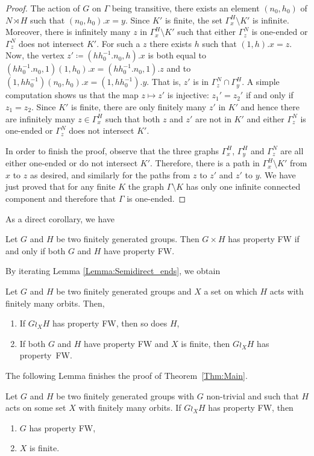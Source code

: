 \begin{proof}
The action of $G$ on $\Gamma$ being transitive, there exists an element $(n_0,h_0)$ of $N \rtimes H$ such that $(n_0,h_0).x = y$.
Since $K'$ is finite, the set $\Gamma_x^H\setminus K'$ is infinite.
Moreover, there is infinitely many $z$ in $\Gamma_x^H\setminus K'$ such that either $\Gamma_z^N$ is one-ended or $\Gamma_z^N$ does not intersect $K'$.
For such a $z$ there exists $h$ such that $(1,h).x=z$.
Now, the vertex $z'\coloneqq(hh_0^{-1}.n_0,h).x$ is both equal to $(hh_0^{-1}.n_0,1)(1,h_0).x=(hh_0^{-1}.n_0,1).z$ and to $(1,hh_0^{-1})(n_0,h_0).x=(1,hh_0^{-1}).y$. That is, $z'$ is in $\Gamma_z^N\cap \Gamma_y^H$.
A simple computation shows us that the map $z\mapsto z'$ is injective: $z_1'=z_2'$ if and only if $z_1=z_2$.
Since $K'$ is finite, there are only finitely many $z'$ in $K'$ and hence there are infinitely many $z\in \Gamma_x^H$ such that both $z$ and $z'$ are not in $K'$ and either $\Gamma_z^N$ is one-ended or $\Gamma_z^N$ does not intersect $K'$.

In order to finish the proof, observe that the three graphs $\Gamma_x^H$, $\Gamma_y^H$ and $\Gamma_z^N$ are all either one-ended or do not intersect $K'$.
Therefore, there is a path in $\Gamma_x^H\setminus K'$ from $x$ to $z$ as desired, and similarly for the paths from $z$ to $z'$ and $z'$ to $y$.
We have just proved that for any finite $K$ the graph $\Gamma\setminus K$ has only one infinite connected component and therefore that $\Gamma$ is one-ended.
\end{proof}
%
%
As a direct corollary, we have
\begin{cor}
Let $G$ and $H$ be two finitely generated groups. Then $G\times H$ has property FW if and only if both $G$ and $H$ have property FW.
\end{cor}
%
%
By iterating Lemma \ref{Lemma:Semidirect_ends}, we obtain
%
%
\begin{cor}\label{Cor:Wreath_ends}
Let $G$ and $H$ be two finitely generated groups and $X$ a set on which $H$ acts with finitely many orbits. Then,
\begin{enumerate}
\item
If $G\wr_X H$ has property FW, then so does $H$,
\item
If both $G$ and $H$ have property FW and $X$ is finite, then $G\wr_X H$ has property~FW.
\end{enumerate}
\end{cor}
%
%
The following Lemma finishes the proof of Theorem~\ref{Thm:Main}.
%
%
\begin{lem}\label{Lem:Wreath_groups_ends}
Let $G$ and $H$ be two finitely generated groups with $G$ non-trivial and such that $H$ acts on some set $X$ with finitely many orbits.
If $G\wr_XH$ has property FW, then
\begin{enumerate}
\item $G$ has property FW,
\item $X$ is finite.
\end{enumerate}
\end{lem}
